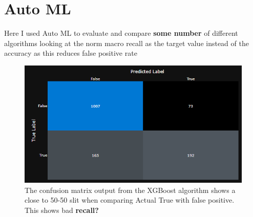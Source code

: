 \section{Auto ML}

Here I used Auto ML to evaluate and compare \textbf{some number} of different algorithms looking at the norm macro recall as the target value instead of the accuracy as this reduces false positive rate

\begin{figure}[hbt!]
 \includegraphics[width=15cm]{figures/azure_ml_confusion_matrix_xg.png}
 \caption{The confusion matrix output from the XGBoost algorithm shows a close to 50-50 slit when comparing Actual True with false positive. This shows bad \textbf{recall?}}
\end{figure}